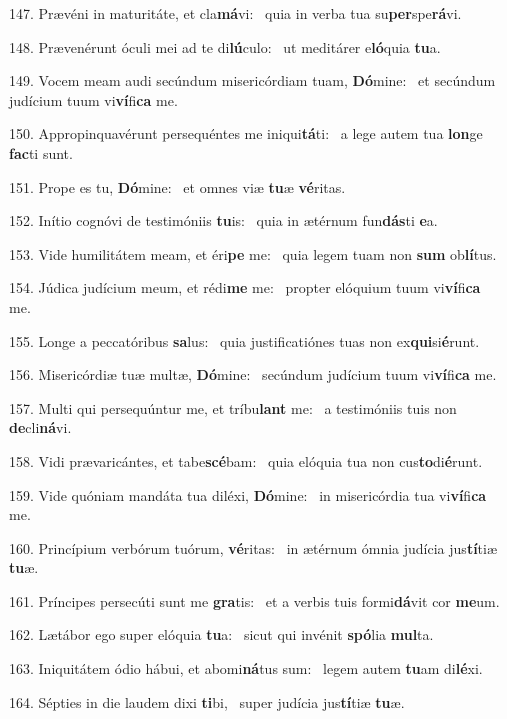 147. Prævéni in maturitáte, et cla\textbf{má}vi: \ast\  quia in verba tua su\textbf{per}spe\textbf{rá}vi.\

148. Prævenérunt óculi mei ad te di\textbf{lú}culo: \ast\  ut meditárer e\textbf{ló}quia \textbf{tu}a.\

149. Vocem meam audi secúndum misericórdiam tuam, \textbf{Dó}mine: \ast\  et secúndum judícium tuum vi\textbf{ví}fi\textbf{ca} me.\

150. Appropinquavérunt persequéntes me iniqui\textbf{tá}ti: \ast\  a lege autem tua \textbf{lon}ge \textbf{fac}ti sunt.\

151. Prope es tu, \textbf{Dó}mine: \ast\  et omnes viæ \textbf{tu}æ \textbf{vé}ritas.\

152. Inítio cognóvi de testimóniis \textbf{tu}is: \ast\  quia in ætérnum fun\textbf{dás}ti \textbf{e}a.\

153. Vide humilitátem meam, et éri\textbf{pe} me: \ast\  quia legem tuam non \textbf{sum} ob\textbf{lí}tus.\

154. Júdica judícium meum, et rédi\textbf{me} me: \ast\  propter elóquium tuum vi\textbf{ví}fi\textbf{ca} me.\

155. Longe a peccatóribus \textbf{sa}lus: \ast\  quia justificatiónes tuas non ex\textbf{qui}si\textbf{é}runt.\

156. Misericórdiæ tuæ multæ, \textbf{Dó}mine: \ast\  secúndum judícium tuum vi\textbf{ví}fi\textbf{ca} me.\

157. Multi qui persequúntur me, et tríbu\textbf{lant} me: \ast\  a testimóniis tuis non \textbf{de}cli\textbf{ná}vi.\

158. Vidi prævaricántes, et tabe\textbf{scé}bam: \ast\  quia elóquia tua non cus\textbf{to}di\textbf{é}runt.\

159. Vide quóniam mandáta tua diléxi, \textbf{Dó}mine: \ast\  in misericórdia tua vi\textbf{ví}fi\textbf{ca} me.\

160. Princípium verbórum tuórum, \textbf{vé}ritas: \ast\  in ætérnum ómnia judícia jus\textbf{tí}tiæ \textbf{tu}æ.\

161. Príncipes persecúti sunt me \textbf{gra}tis: \ast\  et a verbis tuis formi\textbf{dá}vit cor \textbf{me}um.\

162. Lætábor ego super elóquia \textbf{tu}a: \ast\  sicut qui invénit \textbf{spó}lia \textbf{mul}ta.\

163. Iniquitátem ódio hábui, et abomi\textbf{ná}tus sum: \ast\  legem autem \textbf{tu}am di\textbf{lé}xi.\

164. Sépties in die laudem dixi \textbf{ti}bi, \ast\  super judícia jus\textbf{tí}tiæ \textbf{tu}æ.\

